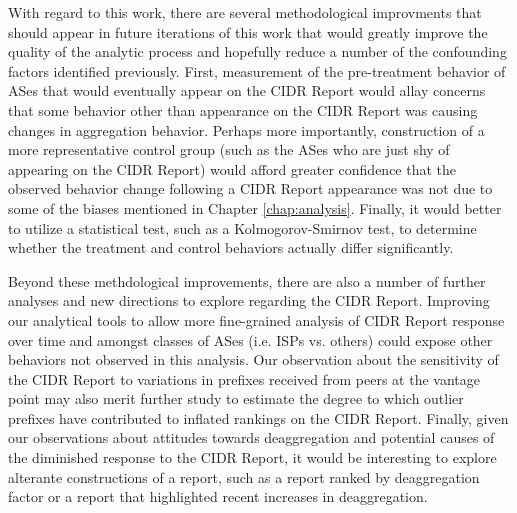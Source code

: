 With regard to this work, there are several methodological improvments that
should appear in future iterations of this work that would greatly improve the
quality of the analytic process and hopefully reduce a number of the
confounding factors identified previously. First, measurement of the
pre-treatment behavior of ASes that would eventually appear on the CIDR Report
would allay concerns that some behavior other than appearance on the CIDR
Report was causing changes in aggregation behavior. Perhaps more importantly,
construction of a more representative control group (such as the ASes who are
just shy of appearing on the CIDR Report) would afford greater confidence that
the observed behavior change following a CIDR Report appearance was not due to
some of the biases mentioned in Chapter \ref{chap:analysis}. Finally, it would
better to utilize a statistical test, such as a Kolmogorov-Smirnov test, to
determine whether the treatment and control behaviors actually differ
significantly.

Beyond these methdological improvements, there are also a number of further
analyses and new directions to explore regarding the CIDR Report. Improving our
analytical tools to allow more fine-grained analysis of CIDR Report response
over time and amongst classes of ASes (i.e. ISPs vs. others) could expose other
behaviors not observed in this analysis. Our observation about the sensitivity
of the CIDR Report to variations in prefixes received from peers at the vantage
point may also merit further study to estimate the degree to which outlier
prefixes have contributed to inflated rankings on the CIDR Report.  Finally,
given our observations about attitudes towards deaggregation and potential
causes of the diminished response to the CIDR Report, it would be interesting
to explore alterante constructions of a report, such as a report ranked by
deaggregation factor or a report that highlighted recent increases in
deaggregation.



